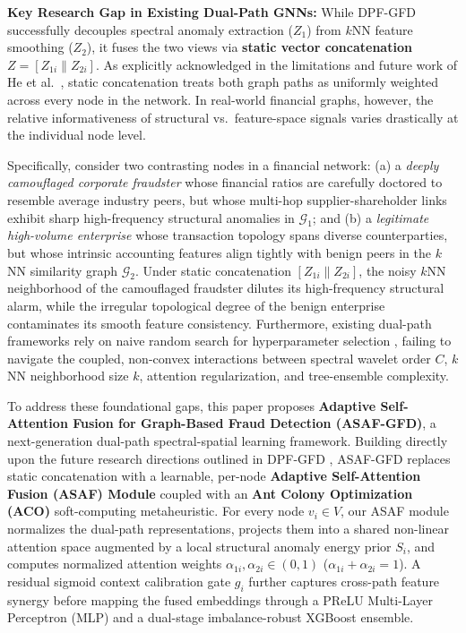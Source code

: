 \documentclass[10pt,a4paper,twocolumn]{article}
\begin{document}
\vspace{2pt}
\noindent\colorbox{boxbg}{%
  \parbox{\dimexpr\linewidth-2\fboxsep\relax}{%
    \vspace{3pt}
    \textbf{\color{darkblue}Key Research Gap in Existing Dual-Path GNNs:} While DPF-GFD \cite{ref9} successfully decouples spectral anomaly extraction ($Z_1$) from $k$NN feature smoothing ($Z_2$), it fuses the two views via \textbf{static vector concatenation} $Z = [Z_{1i} \parallel Z_{2i}]$. As explicitly acknowledged in the limitations and future work of He et al.\ \cite{ref9}, static concatenation treats both graph paths as uniformly weighted across every node in the network. In real-world financial graphs, however, the relative informativeness of structural vs.\ feature-space signals varies drastically at the individual node level.
    \vspace{3pt}
  }%
}
\vspace{2pt}

Specifically, consider two contrasting nodes in a financial network: (a) a \textit{deeply camouflaged corporate fraudster} whose financial ratios are carefully doctored to resemble average industry peers, but whose multi-hop supplier-shareholder links exhibit sharp high-frequency structural anomalies in $\mathscr{G}_1$; and (b) a \textit{legitimate high-volume enterprise} whose transaction topology spans diverse counterparties, but whose intrinsic accounting features align tightly with benign peers in the $k$NN similarity graph $\mathscr{G}_2$. Under static concatenation $[Z_{1i} \parallel Z_{2i}]$, the noisy $k$NN neighborhood of the camouflaged fraudster dilutes its high-frequency structural alarm, while the irregular topological degree of the benign enterprise contaminates its smooth feature consistency. Furthermore, existing dual-path frameworks rely on naive random search for hyperparameter selection \cite{ref9}, failing to navigate the coupled, non-convex interactions between spectral wavelet order $C$, $k$NN neighborhood size $k$, attention regularization, and tree-ensemble complexity.

To address these foundational gaps, this paper proposes \textbf{Adaptive Self-Attention Fusion for Graph-Based Fraud Detection (ASAF-GFD)}, a next-generation dual-path spectral-spatial learning framework. Building directly upon the future research directions outlined in DPF-GFD \cite{ref9}, ASAF-GFD replaces static concatenation with a learnable, per-node \textbf{Adaptive Self-Attention Fusion (ASAF) Module} coupled with an \textbf{Ant Colony Optimization (ACO)} soft-computing metaheuristic. For every node $v_i \in V$, our ASAF module normalizes the dual-path representations, projects them into a shared non-linear attention space augmented by a local structural anomaly energy prior $S_i$, and computes normalized attention weights $\alpha_{1i}, \alpha_{2i} \in (0, 1)$ ($\alpha_{1i} + \alpha_{2i} = 1$). A residual sigmoid context calibration gate $g_i$ further captures cross-path feature synergy before mapping the fused embeddings through a PReLU Multi-Layer Perceptron (MLP) and a dual-stage imbalance-robust XGBoost ensemble.
\end{document}
